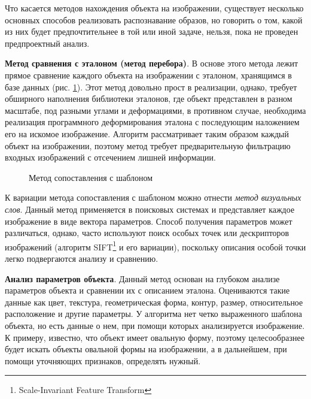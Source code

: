 Что касается методов нахождения объекта на изображении, существует несколько основных способов реализовать распознавание образов, но говорить о том, какой из них будет предпочтительнее в той или иной задаче, нельзя, пока не проведен предпроектный анализ.

\textbf{Метод сравнения с эталоном (метод перебора)}. В основе этого метода лежит прямое сравнение каждого объекта на изображении с эталоном, хранящимся в базе данных (рис. \cref{fig:tempm}). Этот метод довольно прост в реализации, однако, требует обширного наполнения библиотеки эталонов, где объект представлен в разном масштабе, под разными углами и деформациями, в противном случае, необходима реализация программного деформирования эталона с последующим наложением его на искомое изображение. Алгоритм рассматривает таким образом каждый объект на изображении, поэтому метод требует предварительную фильтрацию входных изображений с отсечением лишней информации.

\begin{figure}[ht]
	\caption{Метод сопоставления с шаблоном}\label{fig:tempm}
\end{figure}

К вариации метода сопоставления с шаблоном можно отнести \textit{метод визуальных слов}. Данный метод применяется в поисковых системах и представляет каждое изображение в виде вектора параметров. Способ получения параметров может различаться, однако, часто используют поиск особых точек или дескрипторов изображений (алгоритм SIFT\footnote{Scale-Invariant Feature Transform} и его вариации), поскольку описания особой точки легко подвергаются анализу и сравнению.

\textbf{Анализ параметров объекта}. Данный метод основан на глубоком анализе параметров объекта и сравнении их с описанием эталона. Оцениваются такие данные как цвет, текстура, геометрическая форма, контур, размер, относительное расположение и другие параметры. У алгоритма нет четко выраженного шаблона объекта, но есть данные о нем, при помощи которых анализируется изображение. К примеру, известно, что объект имеет овальную форму, поэтому целесообразнее будет искать объекты овальной формы на изображении, а в дальнейшем, при помощи уточняющих признаков, определять нужный.

